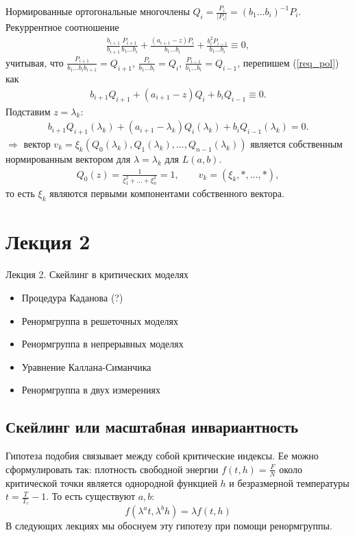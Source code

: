 \documentclass[a4paper,12pt]{article}
\theoremstyle{definition}
\theoremstyle{definition}
\theoremstyle{definition}
\newcommand{\bear}[1]{\begin{eqnarray}\label{#1}}
\newcommand{\ear}{\end{eqnarray}}
\begin{document}
Нормированные ортогональные многочлены $Q_{i} = \displaystyle\frac{P_{i}}{|P_{i}|} = \left(b_{1}\ldots b_{i}\right)^{-1}P_{i}$.\\
Рекуррентное соотношение
\bear{req_pol}
\frac{b_{i+1}}{b_{i+1}}\frac{P_{i+1}}{b_{1}\ldots b_{i}} + \frac{(a_{i+1} -z)P_{i}}{b_{1}\ldots b_{i}} + \frac{b^{2}_{i}P_{i-1}}{b_{1}\ldots b_{i}} \equiv 0,
\ear
учитывая, что $\displaystyle\frac{P_{i+1}}{b_{1}\ldots b_{i}b_{i+1}} = Q_{i+1}$, $\displaystyle\frac{P_{i}}{b_{1}\ldots b_{i}} = Q_{i}$, $\displaystyle\frac{P_{i-1}}{b_{1}\ldots b_{i}} = Q_{i-1}$,
перепишем  (\ref{req_pol})  как
\bear{repol2}
b_{i+1}Q_{i+1} + \left(a_{i+1} -z\right)Q_{i} + b_{i}Q_{i-1} \equiv 0.
\ear
Подставим $z= \lambda_{k}$:
\bear{rec_pol3}
b_{i+1}Q_{i+1}(\lambda_{k}) + (a_{i+1} - \lambda_{k})Q_{i}(\lambda_{k}) + b_{i}Q_{i-1}(\lambda_{k}) = 0.
\ear
$\Rightarrow$ вектор $v_{k} = \xi_{k}\left(Q_{0}(\lambda_{k}),Q_{1}(\lambda_{k}),\ldots,Q_{n-1}(\lambda_{k})\right)$ является собственным нормированным вектором для
$\lambda = \lambda_{k}$ для $L(a,b)$.
\bear{Q0}
Q_{0}(z) =  \frac{1}{\xi^{2}_{1} + \ldots + \xi^{2}_{n}} =1, \qquad v_{k} = (\xi_{k},*,\ldots,*),
\ear
то есть $\xi_{k}$ являются первыми компонентами собственного вектора.

\section{Лекция 2}
\label{sec:-2}


 Лекция 2. Скейлинг в критических моделях
  \begin{itemize}
  \item Процедура Каданова (?)
  \item Ренормгруппа в решеточных моделях
  \item Ренормгруппа в непрерывных моделях
  \item Уравнение Каллана-Симанчика
  \item Ренормгруппа в двух измерениях
  \end{itemize}



\subsection{Скейлинг или масштабная инвариантность}
\label{sec:scaling}

Гипотеза подобия связывает между собой критические индексы. Ее можно сформулировать так: плотность свободной энергии $f(t,h)=\frac{F}{N}$ около критической точки является однородной функцией $h$ и безразмерной температуры $t=\frac{T}{T_c}-1$. То есть существуют $a,b$:
\begin{equation}
  \label{eq:33}
  f(\lambda^a t,\lambda^b h)=\lambda f(t,h)
\end{equation}
В следующих лекциях мы обоснуем эту гипотезу при помощи ренормгруппы.
\end{document}
